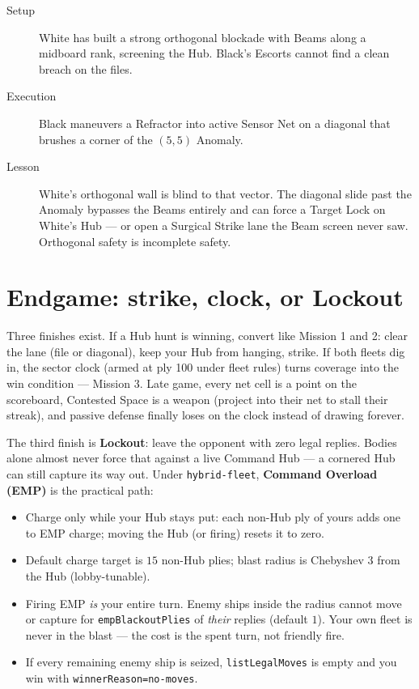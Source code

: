 \documentclass[11pt,a4paper]{article}
\begin{document}
\begin{description}
  \item[Setup] White has built a strong orthogonal blockade with Beams along
        a midboard rank, screening the Hub. Black's Escorts cannot find a
        clean breach on the files.
  \item[Execution] Black maneuvers a Refractor into active Sensor Net on a
        diagonal that brushes a corner of the $(5,5)$ Anomaly.
  \item[Lesson] White's orthogonal wall is blind to that vector. The diagonal
        slide past the Anomaly bypasses the Beams entirely and can force a
        Target Lock on White's Hub --- or open a Surgical Strike lane the
        Beam screen never saw. Orthogonal safety is incomplete safety.
\end{description}

\section{Endgame: strike, clock, or Lockout}

Three finishes exist. If a Hub hunt is winning, convert like Mission 1 and 2:
clear the lane (file or diagonal), keep your Hub from hanging, strike. If both
fleets dig
in, the sector clock (armed at ply 100 under fleet rules) turns coverage into
the win condition --- Mission 3. Late game, every net cell is a point on the
scoreboard, Contested Space is a weapon (project into their net to stall
their streak), and passive defense finally loses on the clock instead of
drawing forever.

The third finish is \textbf{Lockout}: leave the opponent with zero legal
replies. Bodies alone almost never force that against a live Command Hub --- a
cornered Hub can still capture its way out. Under \texttt{hybrid-fleet},
\textbf{Command Overload (EMP)} is the practical path:

\begin{itemize}[leftmargin=*]
  \item Charge only while your Hub stays put: each non-Hub ply of yours adds
        one to EMP charge; moving the Hub (or firing) resets it to zero.
  \item Default charge target is $15$ non-Hub plies; blast radius is Chebyshev
        $3$ from the Hub (lobby-tunable).
  \item Firing EMP \emph{is} your entire turn. Enemy ships inside the radius
        cannot move or capture for \texttt{empBlackoutPlies} of \emph{their}
        replies (default $1$). Your own fleet is never in the blast --- the
        cost is the spent turn, not friendly fire.
  \item If every remaining enemy ship is seized, \texttt{listLegalMoves} is
        empty and you win with \texttt{winnerReason=no-moves}.
\end{itemize}
\end{document}
